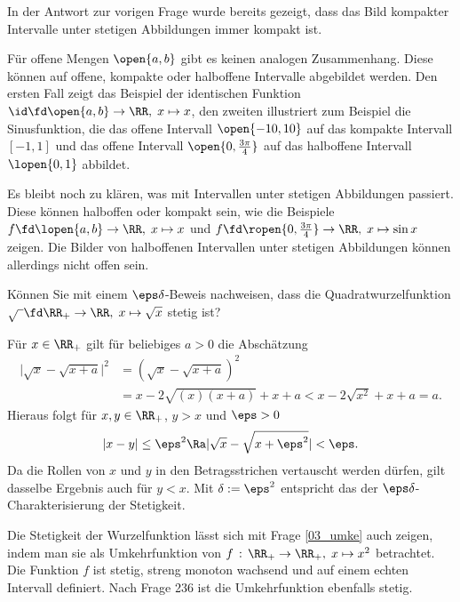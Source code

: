 \begin{antwort}
  In der Antwort zur vorigen Frage wurde bereits gezeigt, dass 
  das Bild kompakter Intervalle unter stetigen Abbildungen immer kompakt 
  ist. 

  Für offene Mengen $\open{a,b}$ gibt es keinen analogen Zusammenhang. 
  Diese können auf offene, kompakte oder halboffene Intervalle 
  abgebildet werden. Den ersten Fall zeigt das Beispiel  
  der identischen Funktion $\id\fd \open{a,b} \to \RR,\; x\mapsto x$, den 
  zweiten illustriert zum Beispiel die Sinusfunktion, die das 
  offene Intervall $\open{-10,10}$ auf das kompakte Intervall $[-1,1]$  
  und das offene Intervall $\open{0,\frac{3\pi}{4}}$ auf das halboffene 
  Intervall $\lopen{0,1}$ abbildet.

  Es bleibt noch zu klären, was mit  Intervallen unter 
  stetigen Abbildungen passiert. Diese können halboffen oder kompakt sein, 
  wie die Beispiele $f\fd \lopen{a,b}\to\RR,\; x\mapsto x$ und 
  $f\fd \ropen{0,\frac{3\pi}{4} } \to\RR, \; x\mapsto \sin x $ zeigen. 
  Die Bilder von halboffenen Intervallen unter stetigen Abbildungen 
  können allerdings nicht offen sein. 
  \AntEnd 
\end{antwort}

\begin{frage}\label{03_sqrt}
  Können Sie mit einem $\eps\delta$-Beweis nachweisen, dass die 
  Quadratwurzelfunktion $\sqrt{\;\,} \fd \RR_+ \to \RR, \; 
  x\mapsto \sqrt{x}$ stetig ist?
\end{frage}

\begin{antwort}
  Für $x\in \RR_+$ gilt für beliebiges $a>0$ die Abschätzung
  \begin{align*}
    \big| \sqrt{x}-\sqrt{x+a} \big|^2 &= ( \sqrt{x}-\sqrt{x+a} )^2 \\
    &=x-2\sqrt{(x)(x+a)}+x+a < x-2\sqrt{x^2} + x+ a = a.
  \end{align*}
  Hieraus folgt für $x,y \in \RR_+$, $y>x$ und $\eps>0$
  \[
  |x-y| \le \eps^2  \Ra
  | \sqrt{x}-\sqrt{x+\eps^2} | < \eps.
  \]
  Da die Rollen von $x$ und $y$ in den Betragsstrichen vertauscht 
  werden dürfen, gilt dasselbe Ergebnis auch für $y<x$. Mit 
  $\delta:=\eps^2$ entspricht das der 
  $\eps\delta$-Charakterisierung der Stetigkeit.

  Die Stetigkeit der Wurzelfunktion lässt sich mit Frage \ref{03_umke}
  auch zeigen, indem 
  man sie als Umkehrfunktion von $f\,:\, \RR_+ \to \RR_+, \; 
  x\mapsto x^2$ betrachtet. Die Funktion $f$ ist stetig, streng monoton 
  wachsend und auf einem echten Intervall definiert. Nach Frage 236 ist die 
  Umkehrfunktion ebenfalls stetig.
  \AntEnd
\end{antwort}

